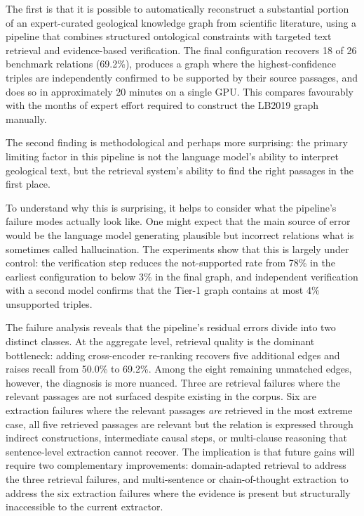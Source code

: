 \documentclass[10pt]{article}
\begin{document}
The first is that it is possible to automatically reconstruct a
substantial portion of an expert-curated geological knowledge graph
from scientific literature, using a pipeline that combines
structured ontological constraints with targeted text retrieval and
evidence-based verification.
The final configuration recovers 18 of 26 benchmark relations
(69.2\%), produces a graph where the highest-confidence triples are
independently confirmed to be supported by their source passages,
and does so in approximately 20 minutes on a single GPU.
This compares favourably with the months of expert effort required
to construct the LB2019 graph manually.

The second finding is methodological and perhaps more surprising:
the primary limiting factor in this pipeline is not the language
model's ability to interpret geological text, but the retrieval
system's ability to find the right passages in the first place.

To understand why this is surprising, it helps to consider what
the pipeline's failure modes actually look like.
One might expect that the main source of error would be the
language model generating plausible but incorrect relations  
what is sometimes called hallucination.
The experiments show that this is largely under control: the
verification step reduces the not-supported rate from 78\% in the
earliest configuration to below 3\% in the final graph, and
independent verification with a second model confirms that the
Tier-1 graph contains at most 4\% unsupported triples.

The failure analysis reveals that the pipeline's
residual errors divide into two distinct classes.
At the aggregate level, retrieval quality is the
dominant bottleneck: adding cross-encoder re-ranking
recovers five additional edges and raises recall
from 50.0\% to 69.2\%.
Among the eight remaining unmatched edges, however,
the diagnosis is more nuanced.
Three are retrieval failures where the relevant
passages are not surfaced despite existing in the
corpus.
Six are extraction failures where the relevant
passages \emph{are} retrieved in the most
extreme case, all five retrieved passages are
relevant but the relation is expressed through
indirect constructions, intermediate causal steps,
or multi-clause reasoning that sentence-level
extraction cannot recover.
The implication is that future gains will require
two complementary improvements: domain-adapted
retrieval to address the three retrieval failures,
and multi-sentence or chain-of-thought extraction
to address the six extraction failures where the
evidence is present but structurally inaccessible
to the current extractor.
\end{document}

